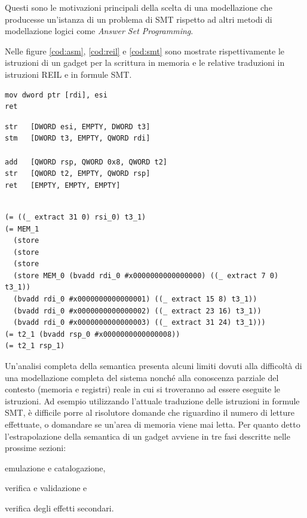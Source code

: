 Questi sono le motivazioni principali della scelta di una modellazione
che producesse un'istanza di un problema di SMT rispetto ad altri
metodi di modellazione logici come \emph{Answer Set Programming}.

Nelle figure \ref{cod:asm}, \ref{cod:reil} e \ref{cod:smt} sono
mostrate rispettivamente le istruzioni di un gadget per la scrittura
in memoria e le relative traduzioni in istruzioni REIL e in formule
SMT.

\begin{lstlisting}[caption=gadget per la scrittura in memoria, label=cod:asm]
mov dword ptr [rdi], esi
ret
\end{lstlisting}


\begin{lstlisting}[caption=traduzione del gadget in fig. \ref{cod:asm}
    nel linguaggio intermedio REIL, label=cod:reil]
str   [DWORD esi, EMPTY, DWORD t3]
stm   [DWORD t3, EMPTY, QWORD rdi]

add   [QWORD rsp, QWORD 0x8, QWORD t2]
str   [QWORD t2, EMPTY, QWORD rsp]
ret   [EMPTY, EMPTY, EMPTY]
\end{lstlisting}

\begin{lstlisting}[caption=traduzione del gadget in fig. \ref{cod:asm}
    in formule SMT, label=cod:smt]

(= ((_ extract 31 0) rsi_0) t3_1)
(= MEM_1 
  (store 
  (store 
  (store 
  (store MEM_0 (bvadd rdi_0 #x0000000000000000) ((_ extract 7 0) t3_1)) 
  (bvadd rdi_0 #x0000000000000001) ((_ extract 15 8) t3_1))
  (bvadd rdi_0 #x0000000000000002) ((_ extract 23 16) t3_1))
  (bvadd rdi_0 #x0000000000000003) ((_ extract 31 24) t3_1)))
(= t2_1 (bvadd rsp_0 #x0000000000000008))
(= t2_1 rsp_1)
\end{lstlisting}

Un'analisi completa della semantica presenta alcuni limiti dovuti alla
difficoltà di una modellazione completa del sistema nonché alla
conoscenza parziale del contesto (memoria e registri) reale in cui si
troveranno ad essere eseguite le istruzioni. Ad esempio utilizzando
l'attuale traduzione delle istruzioni in formule SMT, è difficile
porre al risolutore domande che riguardino il numero di letture
effettuate, o domandare se un'area di memoria viene mai letta. Per
quanto detto l'estrapolazione della semantica di un gadget avviene in
tre fasi descritte nelle prossime sezioni:
\begin{inparaenum}[a)]
\item emulazione e catalogazione, 
\item verifica e validazione e 
\item verifica degli effetti secondari.
\end{inparaenum}



